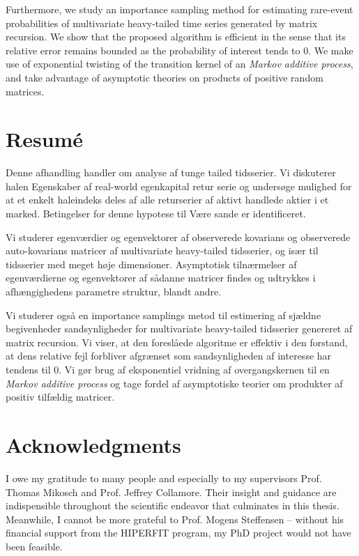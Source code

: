 Furthermore, we study an importance sampling method for estimating
rare-event probabilities of multivariate heavy-tailed time series
generated by matrix recursion. We show that the proposed algorithm is
efficient in the sense that its relative error remains bounded as the
probability of interest tends to 0. We make use of exponential
twisting of the transition kernel of an {\em Markov additive process},
and take advantage of asymptotic theories on products of positive
random matrices.

\section*{Resum{\'e}}
Denne afhandling handler om analyse af tunge tailed tidsserier. Vi
diskuterer halen Egenskaber af real-world egenkapital retur serie og
undersøge mulighed for at et enkelt haleindeks deles af alle
returserier af aktivt handlede aktier i et marked. Betingelser for
denne hypotese til Være sande er identificeret.

Vi studerer egenværdier og egenvektorer af observerede kovarians og
observerede auto-kovarians matricer af multivariate heavy-tailed
tidsserier, og især til tidsserier med meget høje dimensioner.
Asymptotisk tilnærmelser af egenværdierne og egenvektorer af
sådanne matricer findes og udtrykkes i afhængighedens parametre
struktur, blandt andre.

Vi studerer også en importance samplings metod til estimering af
sjældne begivenheder sandsynligheder for multivariate heavy-tailed
tidsserier genereret af matrix recursion. Vi viser, at den foreslåede
algoritme er effektiv i den forstand, at dens relative fejl forbliver
afgrænset som sandsynligheden af interesse har tendens til 0. Vi gør
brug af eksponentiel vridning af overgangskernen til en {\em Markov
additive process} og tage fordel af asymptotiske teorier om produkter
af positiv tilfældig matricer.
\newpage
\section*{Acknowledgments}
I owe my gratitude to many people and especially to my supervisors
Prof. Thomas Mikosch and Prof. Jeffrey Collamore. Their insight and
guidance are indispensible throughout the scientific endeavor that
culminates in this thesis. Meanwhile, I cannot be more grateful to
Prof. Mogens Steffensen -- without his financial
support from the HIPERFIT program, my PhD project would not have
been feasible.

